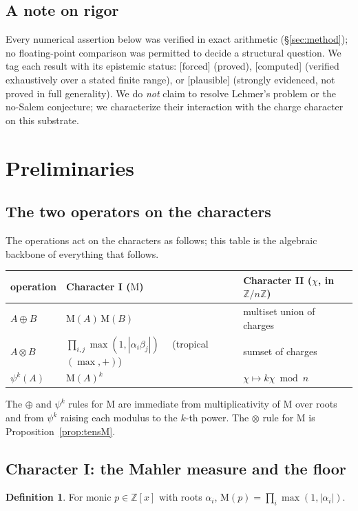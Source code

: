 \documentclass[11pt]{article}
\theoremstyle{definition}
\newtheorem{definition}[theorem]{Definition}
\theoremstyle{remark}
\newcommand{\Mah}{\mathrm{M}}
\newcommand{\Z}{\mathbb{Z}}
\newcommand{\Adams}[1]{\psi^{#1}}
\newcommand{\dsum}{\oplus}
\newcommand{\tens}{\otimes}
\newcommand{\Zmod}[1]{\Z/#1\Z}
\newcommand{\status}[1]{{\small\textsf{[#1]}}}
\newcommand{\forced}{\status{forced}}
\newcommand{\computed}{\status{computed}}
\newcommand{\plausible}{\status{plausible}}
\begin{document}
\subsection{A note on rigor}
Every numerical assertion below was verified in exact arithmetic (\S\ref{sec:method}); no
floating-point comparison was permitted to decide a structural question. We tag each result
with its epistemic status: \forced{} (proved), \computed{} (verified exhaustively over a
stated finite range), or \plausible{} (strongly evidenced, not proved in full generality).
We do \emph{not} claim to resolve Lehmer's problem or the no-Salem conjecture; we
characterize their interaction with the charge character on this substrate.

\section{Preliminaries}\label{sec:prelim}

\subsection{The two operators on the characters}
The operations act on the characters as follows; this table is the algebraic backbone of
everything that follows.

\begin{center}
\begin{tabular}{lll}
\toprule
operation & Character I ($\Mah$) & Character II ($\chi$, in $\Zmod n$) \\
\midrule
$A\dsum B$ & $\Mah(A)\,\Mah(B)$ & multiset union of charges \\
$A\tens B$ & $\prod_{i,j}\max(1,|\alpha_i\beta_j|)$ \ \ (tropical $(\max,+)$) & sumset of charges \\
$\Adams k(A)$ & $\Mah(A)^{k}$ & $\chi\mapsto k\chi \bmod n$ \\
\bottomrule
\end{tabular}
\end{center}

\noindent The $\dsum$ and $\Adams k$ rules for $\Mah$ are immediate from multiplicativity of
$\Mah$ over roots and from $\Adams k$ raising each modulus to the $k$-th power. The $\tens$
rule for $\Mah$ is Proposition~\ref{prop:tensM}.

\subsection{Character I: the Mahler measure and the floor}
\begin{definition}
For monic $p\in\Z[x]$ with roots $\alpha_i$, $\Mah(p)=\prod_i\max(1,|\alpha_i|)$.
\end{definition}
\end{document}

